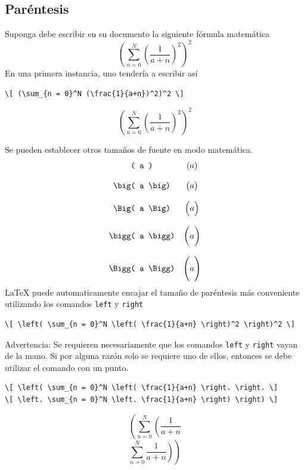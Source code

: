 \documentclass[../notes.tex]{subfiles}
\begin{document}
    \subsection{Paréntesis}

        Suponga debe escribir en su documento la siguiente fórmula matemática
\[ \left( \sum_{n = 0}^N \left( \frac{1}{a+n} \right)^2 \right)^2 \]
        En una primera instancia, uno tendería a escribir así
            \begin{verbatim}
\[ (\sum_{n = 0}^N (\frac{1}{a+n})^2)^2 \]
            \end{verbatim}
        \[ (\sum_{n = 0}^N (\frac{1}{a+n})^2)^2 \]
        
        Se pueden establecer otros tamaños de fuente en modo matemática.
        \[
            \begin{array}{cc}
            	\text{\texttt{( a )}} & ( a )\\
            	& \\
            	\text{\texttt{\textbackslash{}big( a \textbackslash{}big)}} & \big( a \big)\\
            	& \\
            	\text{\texttt{\textbackslash{}Big( a \textbackslash{}Big)}} & \Big( a \Big)\\
            	& \\
            	\text{\texttt{\textbackslash{}bigg( a \textbackslash{}bigg)}} & \bigg( a \bigg)\\
            	& \\
            	\text{\texttt{\textbackslash{}Bigg( a \textbackslash{}Bigg)}} & \Bigg( a \Bigg)
            \end{array}
        \]
        \LaTeX{} puede automaticamente encajar el tamaño de paréntesis más conveniente utilizando los comandos \texttt{left} y \texttt{right}
        \footnotesize{
            \begin{verbatim}
\[ \left( \sum_{n = 0}^N \left( \frac{1}{a+n} \right)^2 \right)^2 \]
            \end{verbatim}
        }
        
        Advertencia: Se requieren necesariamente que los comandos \texttt{left} y \texttt{right} vayan de la mano. Si por alguna razón solo se requiere uno de ellos, entonces se debe utilizar el comando con un punto.

{\footnotesize{
        \begin{verbatim}
\[ \left( \sum_{n = 0}^N \left( \frac{1}{a+n} \right. \right. \]
\[ \left. \sum_{n = 0}^N \left. \frac{1}{a+n} \right) \right) \]
        \end{verbatim}}}
\[ \left( \sum_{n = 0}^N \left( \frac{1}{a+n} \right. \right. \]
\[ \left. \sum_{n = 0}^N \left. \frac{1}{a+n} \right) \right) \]
    
\end{document}
